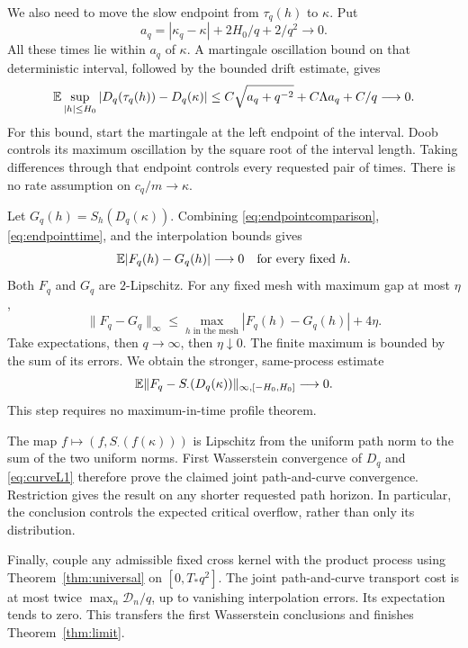 We also need to move the slow endpoint from $\tau_q(h)$ to $\kappa$. Put
\[
 a_q=|\kappa_q-\kappa|+2H_0/q+2/q^2\longrightarrow0.
\]
All these times lie within $a_q$ of $\kappa$. A martingale oscillation bound on that deterministic interval, followed by the bounded drift estimate, gives
\begin{equation}\label{eq:endpointtime}
 \mathbb E\sup_{|h|\le H_0}|D_q(\tau_q(h))-D_q(\kappa)|
 \le C\sqrt{a_q+q^{-2}}+C\Lambda a_q+C/q\longrightarrow0.
\end{equation}
For this bound, start the martingale at the left endpoint of the interval. Doob controls its maximum oscillation by the square root of the interval length. Taking differences through that endpoint controls every requested pair of times. There is no rate assumption on $c_q/m\to\kappa$.

Let $G_q(h)=S_h(D_q(\kappa))$. Combining \eqref{eq:endpointcomparison}, \eqref{eq:endpointtime}, and the interpolation bounds gives
\[
 \mathbb E|F_q(h)-G_q(h)|\longrightarrow0
 \quad\text{for every fixed }h.
\]
Both $F_q$ and $G_q$ are $2$-Lipschitz. For any fixed mesh with maximum gap at most $\eta$,
\[
 \|F_q-G_q\|_\infty
 \le\max_{h\text{ in the mesh}}|F_q(h)-G_q(h)|+4\eta.
\]
Take expectations, then $q\to\infty$, then $\eta\downarrow0$. The finite maximum is bounded by the sum of its errors. We obtain the stronger, same-process estimate
\begin{equation}\label{eq:curveL1}
 \mathbb E\|F_q-S_{\cdot}(D_q(\kappa))\|_{\infty,[-H_0,H_0]}
 \longrightarrow0.
\end{equation}
This step requires no maximum-in-time profile theorem.

The map $f\mapsto(f,S_{\cdot}(f(\kappa)))$ is Lipschitz from the uniform path norm to the sum of the two uniform norms. First Wasserstein convergence of $D_q$ and \eqref{eq:curveL1} therefore prove the claimed joint path-and-curve convergence. Restriction gives the result on any shorter requested path horizon. In particular, the conclusion controls the expected critical overflow, rather than only its distribution.

Finally, couple any admissible fixed cross kernel with the product process using Theorem~\ref{thm:universal} on $[0,T_*q^2]$. The joint path-and-curve transport cost is at most twice $\max_n\mathcal D_n/q$, up to vanishing interpolation errors. Its expectation tends to zero. This transfers the first Wasserstein conclusions and finishes Theorem~\ref{thm:limit}.
